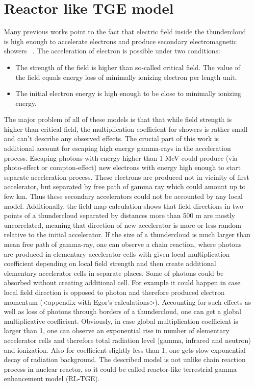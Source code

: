 \documentclass[utf8]{webofc}
\begin{document}
\section{Reactor like TGE model}
Many previous works point to the fact that electric field inside the thundercloud is high enough to accelerate electrons and produce secondary electromagnetic showers ~\cite{gurevich1992runaway, gurevich1999lightning,dwyer2003fundamental,dwyer2011low}. The acceleration of electron is possible under two conditions:
\begin{itemize}
    \item The strength of the field is higher than so-called critical field. The value of the field equals energy loss of minimally ionizing electron per length unit.
    \item The initial electron energy is high enough to be close to minimally ionizing energy.
\end{itemize}
The major problem of all of these models is that that while field strength is higher than critical field, the multiplication coefficient for showers is rather small and can’t describe any observed effects.
The crucial part of this work is additional account for escaping high energy gamma-rays in the acceleration process. Escaping photons with energy higher than 1 MeV could produce (via photo-effect or compton-effect) new electrons with energy high enough to start separate acceleration process. These electrons are produced not in vicinity of first accelerator, but separated by free path of gamma ray which could amount up to few km. Thus these secondary accelerators could not be accounted by any local model. Additionally, the field map calculation shows that field directions in two points of a thundercloud separated by distances more than 500 m are mostly uncorrelated, meaning that direction of new accelerator is more or less random relative to the initial accelerator.
If the size of a thundercloud is much larger than mean free path of gamma-ray, one can observe a chain reaction, where photons are produced in elementary accelerator cells with given local multiplication coefficient depending on local field strength and then create additional elementary accelerator cells in separate places. Some of photons could be absorbed without creating additional cell. For example it could happen in case local field direction is opposed to photon and therefore produced electron momentum (<appendix with Egor’s calculations>). Accounting for such effects as well as loss of photons through borders of a thundercloud, one can get a global multiplicative coefficient. Obviously, in case global multiplication coefficient is larger than 1, one can observe an exponential rise in number of elementary accelerator cells and therefore total radiation level (gamma, infrared and neutron) and ionization. Also for coefficient slightly less than 1, one gets slow exponential decay of radiation background.
The described model is not unlike chain reaction process in nuclear reactor, so it could be called reactor-like terrestrial gamma enhancement model (RL-TGE).
\end{document}
